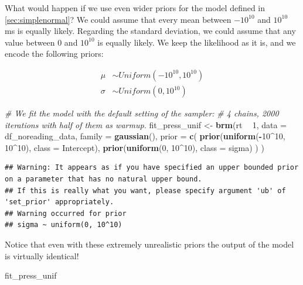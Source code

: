 \documentclass[12pt,]{krantz}
\newenvironment{Shaded}{\begin{snugshade}}{\end{snugshade}}
\newcommand{\CommentTok}[1]{\textcolor[rgb]{0.56,0.35,0.01}{\textit{#1}}}
\newcommand{\DataTypeTok}[1]{\textcolor[rgb]{0.13,0.29,0.53}{#1}}
\newcommand{\DecValTok}[1]{\textcolor[rgb]{0.00,0.00,0.81}{#1}}
\newcommand{\KeywordTok}[1]{\textcolor[rgb]{0.13,0.29,0.53}{\textbf{#1}}}
\newcommand{\NormalTok}[1]{#1}
\newcommand{\OperatorTok}[1]{\textcolor[rgb]{0.81,0.36,0.00}{\textbf{#1}}}
\newcommand{\StringTok}[1]{\textcolor[rgb]{0.31,0.60,0.02}{#1}}
\theoremstyle{definition}
\theoremstyle{definition}
\theoremstyle{definition}
\theoremstyle{remark}
\begin{document}
What would happen if we use even wider priors for the model defined in \ref{sec:simplenormal}? We could assume that every mean between \(-10^{10}\) and \(10^{10}\) ms is equally likely. Regarding the standard deviation, we could assume that any value between \(0\) and \(10^{10}\) is equally likely. We keep the likelihood as it is, and we encode the following priors:

\begin{equation}
\begin{aligned}
\mu &\sim Uniform(-10^{10}, 10^{10}) \\
\sigma &\sim Uniform(0,  10^{10}) 
\end{aligned}
\label{eq:rtpriorsflat}
\end{equation}

\begin{Shaded}
\begin{Highlighting}[]
\CommentTok{# We fit the model with the default setting of the sampler:}
\CommentTok{# 4 chains, 2000 iterations with half of them as warmup.}
\NormalTok{fit_press_unif <-}\StringTok{ }\KeywordTok{brm}\NormalTok{(rt }\OperatorTok{~}\StringTok{ }\DecValTok{1}\NormalTok{,}
  \DataTypeTok{data =}\NormalTok{ df_noreading_data,}
  \DataTypeTok{family =} \KeywordTok{gaussian}\NormalTok{(),}
  \DataTypeTok{prior =} \KeywordTok{c}\NormalTok{(}
    \KeywordTok{prior}\NormalTok{(}\KeywordTok{uniform}\NormalTok{(}\OperatorTok{-}\DecValTok{10}\OperatorTok{^}\DecValTok{10}\NormalTok{, }\DecValTok{10}\OperatorTok{^}\DecValTok{10}\NormalTok{), }\DataTypeTok{class =}\NormalTok{ Intercept),}
    \KeywordTok{prior}\NormalTok{(}\KeywordTok{uniform}\NormalTok{(}\DecValTok{0}\NormalTok{, }\DecValTok{10}\OperatorTok{^}\DecValTok{10}\NormalTok{), }\DataTypeTok{class =}\NormalTok{ sigma)}
\NormalTok{  )}
\NormalTok{)}
\end{Highlighting}
\end{Shaded}

\begin{verbatim}
## Warning: It appears as if you have specified an upper bounded prior on a parameter that has no natural upper bound.
## If this is really what you want, please specify argument 'ub' of 'set_prior' appropriately.
## Warning occurred for prior 
## sigma ~ uniform(0, 10^10)
\end{verbatim}

Notice that even with these extremely unrealistic priors the output of the model is virtually identical!

\begin{Shaded}
\begin{Highlighting}[]
\NormalTok{fit_press_unif}
\end{Highlighting}
\end{Shaded}
\end{document}
